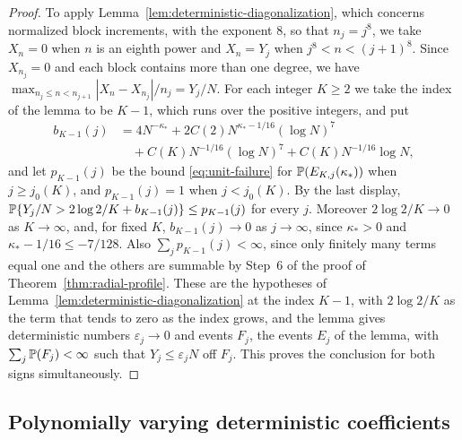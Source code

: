 \begin{proof}
To apply Lemma~\ref{lem:deterministic-diagonalization}, which concerns
normalized block increments, with the exponent $8$, so that $n_j=j^8$,
we take $X_n=0$ when $n$ is an eighth power and $X_n=Y_j$ when
$j^8<n<(j+1)^8$. Since $X_{n_j}=0$ and each block contains more than one
degree, we have
$\max_{n_j\le n<n_{j+1}}|X_n-X_{n_j}|/n_j=Y_j/N$.
For each integer $K\ge2$ we take the index of the lemma to be $K-1$,
which runs over the positive integers, and put
\begin{align*}
 b_{K-1}(j)&=4N^{-\kappa_*}+2C(2)N^{\kappa_*-1/16}(\log N)^7\\
 &\quad+C(K)N^{-1/16}(\log N)^7+C(K)N^{-1/16}\log N,
\end{align*}
and let $p_{K-1}(j)$ be the bound \eqref{eq:unit-failure} for
$\mathbb P(E_{K,j}(\kappa_*))$ when $j\ge j_0(K)$, and $p_{K-1}(j)=1$ when
$j<j_0(K)$. By the last display,
$\mathbb P\{Y_j/N>2\log2/K+b_{K-1}(j)\}\le p_{K-1}(j)$ for every $j$.
Moreover $2\log2/K\to0$ as $K\to\infty$, and, for fixed
$K$, $b_{K-1}(j)\to0$ as $j\to\infty$, since $\kappa_*>0$ and
$\kappa_*-1/16\le-7/128$. Also $\sum_jp_{K-1}(j)<\infty$, since only finitely
many terms equal one and the others are summable by Step~6 of the proof
of Theorem~\ref{thm:radial-profile}. These are the hypotheses of
Lemma~\ref{lem:deterministic-diagonalization} at the index $K-1$, with
$2\log2/K$ as the term that tends to zero as the index grows, and the
lemma gives deterministic numbers $\varepsilon_j\to0$ and events $F_j$, the
events $E_j$ of the lemma, with $\sum_j\mathbb P(F_j)<\infty$ such that
$Y_j\le\varepsilon_jN$ off $F_j$. This proves the conclusion for both
signs simultaneously.
\end{proof}

\subsection{Polynomially varying deterministic coefficients}


